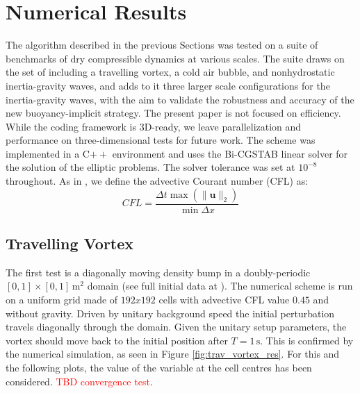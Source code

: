 \documentclass{ametsoc}
\theoremstyle{definition}
\newcommand{\benacchio}[1]{\textcolor{red}{#1}}
\begin{document}

\section{Numerical Results}
\label{sec:Results}

The algorithm described in the previous Sections was tested on a suite of benchmarks of dry compressible dynamics at various scales. The suite draws on the set of \cite{Benacchio2014,BenacchioEtAl2014} including a travelling vortex, a cold air bubble, and nonhydrostatic inertia-gravity waves, and adds to it three larger scale configurations for the inertia-gravity waves, with the aim to validate the robustness and accuracy of the new buoyancy-implicit strategy. The present paper is not focused on efficiency. While the coding framework is 3D-ready, we leave parallelization and performance on three-dimensional tests for future work. The scheme was implemented in a C$++$ environment and uses the Bi-CGSTAB linear solver \citep{Vandervorst1992} for the solution of the elliptic problems. The solver tolerance was set at $10^{-8}$ throughout. As in \cite{BenacchioEtAl2014}, we define the advective Courant number (CFL) as:
%
\begin{equation}
 CFL=\dfrac{\Delta t \max(\|\mathbf{u}\|_2)}{\min{\Delta x}}
\end{equation}
%

\subsection{Travelling Vortex}

The first test is a diagonally moving density bump in a doubly-periodic $[0,1]\times[0,1]\,\textrm{m}^2$ domain (see full initial data at \cite{KadiogluEtAl2008, Benacchio2014}). The numerical scheme is run on a uniform grid made of $192x192$ cells with advective CFL value $0.45$ and without gravity. Driven by unitary background speed the initial perturbation travels diagonally through the domain. Given the unitary setup parameters, the vortex should move back to the initial position after $T=1\,\textrm{s}$. This is confirmed by the numerical simulation, as seen in Figure \ref{fig:trav_vortex_res}. For this and the following plots, the value of the variable at the cell centres has been considered. \benacchio{TBD convergence test}.
\end{document}
